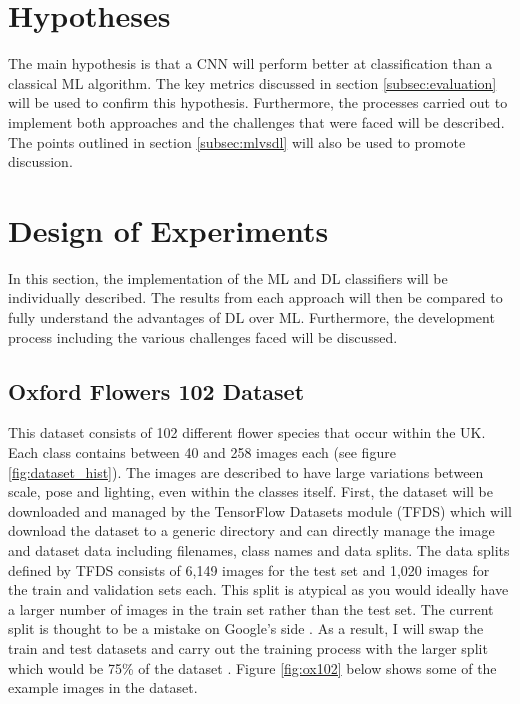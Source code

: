 \documentclass[12pt,a4paper]{report}
\begin{document}
\section{Hypotheses}

The main hypothesis is that a CNN will perform better at classification than a classical ML algorithm. The key metrics 
discussed in section \ref{subsec:evaluation} will be used to confirm this hypothesis. Furthermore, the processes carried
out to implement both approaches and the challenges that were faced will be described. The points outlined in section 
\ref{subsec:mlvsdl} will also be used to promote discussion. 

\section{Design of Experiments}

In this section, the implementation of the ML and DL classifiers will be individually described. The results from each
approach will then be compared to fully understand the advantages of DL over ML. Furthermore, the development process
including the various challenges faced will be discussed.

\subsection{Oxford Flowers 102 Dataset}

This dataset consists of 102 different flower species that occur within the UK. Each class contains between 40 and 258 
images each (see figure \ref{fig:dataset_hist}). The images are described to have large variations between scale, 
pose and lighting, even within the classes
itself. First, the dataset will be downloaded and managed by the TensorFlow Datasets module (TFDS) which will download 
the dataset to a generic directory and can directly manage the image and dataset data including filenames, class names 
and data splits. The data splits defined by TFDS consists of 6,149 images for the test set and 1,020 images for the 
train and validation sets each. This split is atypical as you would ideally have a larger number of images in the train 
set rather than the test set. The current split is thought to be a mistake on Google's side \citep{githubissue}. As a 
result, I will swap the train and test datasets and carry out the training process with the larger split which would be 
75\% of the dataset \citep{TFOX102}. Figure \ref{fig:ox102} below shows some of the example images in the dataset.
\end{document}
